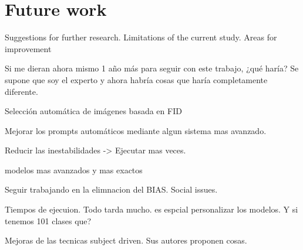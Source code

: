 \chapter{Future work} \label{sec:future}

Suggestions for further research. Limitations of the current study. Areas for improvement

Si me dieran ahora mismo 1 año más para seguir con este trabajo, ¿qué haría? Se supone que soy el experto y ahora habría cosas que haría completamente diferente.

Selección automática de imágenes basada en FID

Mejorar los prompts automáticos mediante algun sistema mas avanzado.

Reducir las inestabilidades -> Ejecutar mas veces.

modelos mas avanzados y mas exactos

Seguir trabajando en la elimnacion del BIAS. Social issues.

Tiempos de ejecuion. Todo tarda mucho. es espcial personalizar los modelos. Y si tenemos 101 clases que?

Mejoras de las tecnicas subject driven. Sus autores proponen cosas.

